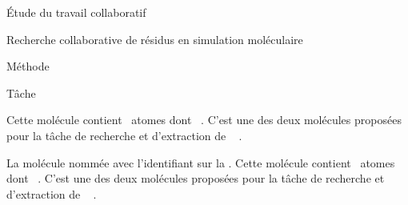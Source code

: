 \documentclass[myfrancais]{mythesis}
\begin{document}
\begin{mypart}{Étude du travail collaboratif}
\begin{mychapter}{Recherche collaborative de résidus en simulation moléculaire}
\begin{mysection}{Méthode}
\begin{mysubsection}{Tâche}
\begin{description}
							Cette molécule contient ~atomes dont ~.
							C'est une des deux molécules proposées pour la tâche de recherche et d'extraction de ~ .
						\item[\myPrion]
							La molécule nommée \myPrion {} avec l'identifiant \myPDB {} sur la \myPDBbase\footnotemark[\value{footnote}].
							Cette molécule contient ~atomes dont ~.
							C'est une des deux molécules proposées pour la tâche de recherche et d'extraction de ~ .
					\end{description}


\end{mysubsection}
\end{mysection}
\end{mychapter}
\end{mypart}
\end{document}
